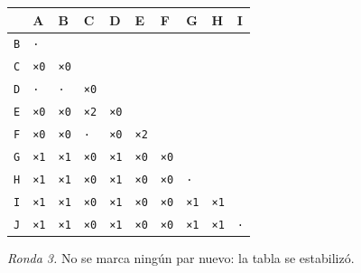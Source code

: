 \documentclass[11pt]{article}
\begin{document}
\begin{center}\footnotesize\begin{tabular}{llllllllll}\toprule
 & A & B & C & D & E & F & G & H & I \\\midrule
\texttt{B} & \texttt{·} & \texttt{} & \texttt{} & \texttt{} & \texttt{} & \texttt{} & \texttt{} & \texttt{} & \texttt{} \\
\texttt{C} & \texttt{×0} & \texttt{×0} & \texttt{} & \texttt{} & \texttt{} & \texttt{} & \texttt{} & \texttt{} & \texttt{} \\
\texttt{D} & \texttt{·} & \texttt{·} & \texttt{×0} & \texttt{} & \texttt{} & \texttt{} & \texttt{} & \texttt{} & \texttt{} \\
\texttt{E} & \texttt{×0} & \texttt{×0} & \texttt{×2} & \texttt{×0} & \texttt{} & \texttt{} & \texttt{} & \texttt{} & \texttt{} \\
\texttt{F} & \texttt{×0} & \texttt{×0} & \texttt{·} & \texttt{×0} & \texttt{×2} & \texttt{} & \texttt{} & \texttt{} & \texttt{} \\
\texttt{G} & \texttt{×1} & \texttt{×1} & \texttt{×0} & \texttt{×1} & \texttt{×0} & \texttt{×0} & \texttt{} & \texttt{} & \texttt{} \\
\texttt{H} & \texttt{×1} & \texttt{×1} & \texttt{×0} & \texttt{×1} & \texttt{×0} & \texttt{×0} & \texttt{·} & \texttt{} & \texttt{} \\
\texttt{I} & \texttt{×1} & \texttt{×1} & \texttt{×0} & \texttt{×1} & \texttt{×0} & \texttt{×0} & \texttt{×1} & \texttt{×1} & \texttt{} \\
\texttt{J} & \texttt{×1} & \texttt{×1} & \texttt{×0} & \texttt{×1} & \texttt{×0} & \texttt{×0} & \texttt{×1} & \texttt{×1} & \texttt{·} \\
\bottomrule\end{tabular}\end{center}
\textit{Ronda 3.} No se marca ningún par nuevo: la tabla se estabilizó.
\end{document}
